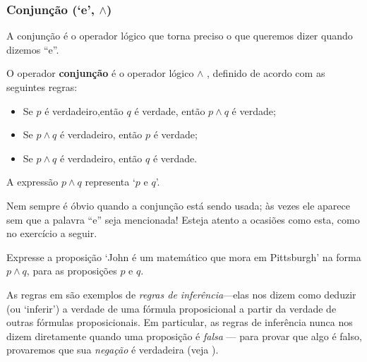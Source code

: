 \subsubsection*{Conjunção (`e', $\wedge$)}

A conjunção é o operador lógico que torna preciso o que queremos dizer quando dizemos “e”.
\begin{idefinition}
\label{defConjunction}
O operador \textbf{conjunção} é o operador lógico $\wedge$ , definido de acordo com as seguintes regras:
\begin{itemize}
\item \introrule{\wedge} Se $p$ é verdadeiro,então $q$ é verdade, então $p \wedge q$ é verdade;
\item {} Se $p \wedge q$ é verdadeiro, então $p$ é verdade;
\item {} Se $p \wedge q$ é verdadeiro, então $q$ é verdade.
\end{itemize}
A expressão $p \wedge q$ representa `$p$ e $q$'.
\end{idefinition}

Nem sempre é óbvio quando a conjunção está sendo usada; às vezes ele aparece sem que a palavra “e” seja mencionada! Esteja atento a ocasiões como esta, como no exercício a seguir.


\begin{exercise}
\label{exJohnMathematicianPittsburgh}
Expresse a proposição `John é um matemático que mora em Pittsburgh' na forma $p \wedge q$, para as proposições $p$ e $q$.
\end{exercise}

As regras em  são exemplos de \textit{regras de inferência}---elas nos dizem como deduzir (ou `inferir') a verdade de uma fórmula proposicional a partir da verdade de outras fórmulas proposicionais. Em particular, as regras de inferência nunca nos dizem diretamente quando uma proposição é \textit{falsa} --- para provar que algo é falso, provaremos que sua \textit{negação} é verdadeira (veja ).

